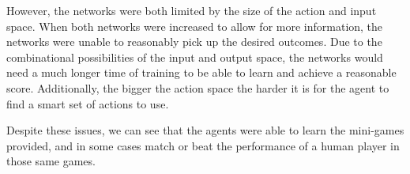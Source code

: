 However, the networks were both limited by the size of the action and input
space. When both networks were increased to allow for more information, the
networks were unable to reasonably pick up the desired outcomes. Due to the
combinational possibilities of the input and output space, the networks would
need a much longer time of training to be able to learn and achieve a reasonable
score. Additionally, the bigger the action space the harder it is for the agent
to find a smart set of actions to use.

Despite these issues, we can see that the agents were able to learn the
mini-games provided, and in some cases match or beat the performance of a human
player in those same games.
